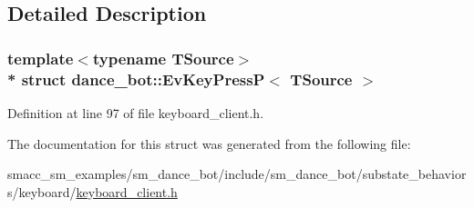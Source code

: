 \subsection{Detailed Description}
\subsubsection*{template$<$typename T\+Source$>$\\*
struct dance\+\_\+bot\+::\+Ev\+Key\+Press\+P$<$ T\+Source $>$}



Definition at line 97 of file keyboard\+\_\+client.\+h.



The documentation for this struct was generated from the following file\+:\begin{DoxyCompactItemize}
\item 
smacc\+\_\+sm\+\_\+examples/sm\+\_\+dance\+\_\+bot/include/sm\+\_\+dance\+\_\+bot/substate\+\_\+behaviors/keyboard/\hyperlink{keyboard__client_8h}{keyboard\+\_\+client.\+h}\end{DoxyCompactItemize}
